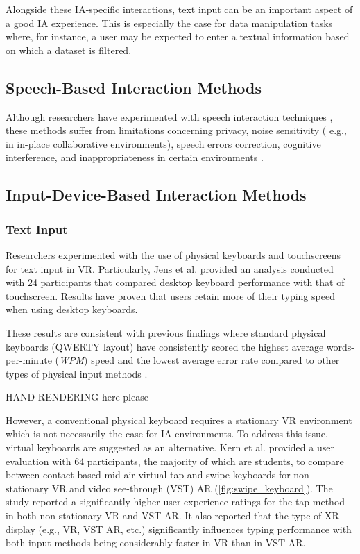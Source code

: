 \documentclass{vgtc}                          %
\begin{document}
\smallskip

\noindent Alongside these IA-specific interactions, text input can be an important aspect of a good IA
experience. This is especially the case for data manipulation tasks where, for instance, a user may be
expected to enter a textual information based on which a dataset is filtered.


\subsection {Speech-Based Interaction Methods}

\noindent Although researchers have experimented with speech interaction techniques
\cite{wizualization_toolkit}, these methods suffer from limitations concerning privacy, noise sensitivity (
e.g., in in-place collaborative environments), speech errors correction, cognitive interference, and
inappropriateness in certain environments \cite{limits_of_speech_recognition}.

\subsection {Input-Device-Based Interaction Methods}
\subsubsection {Text Input}
\noindent Researchers experimented with the use of physical keyboards and touchscreens for text input
in VR. Particularly, Jens et al. \cite{keyboard_vs_touchscreen} provided an analysis conducted with 24
participants that compared desktop keyboard performance with that of touchscreen. Results have proven that
users retain more of their typing speed when using desktop keyboards.

These results are consistent with previous findings where standard physical keyboards
(QWERTY layout) have consistently scored the highest average words-per-minute (\textit{WPM}) speed and the
lowest average error rate compared to other types of physical input methods \cite{physical_text_entry_comparison}.

HAND RENDERING here please

\noindent However, a conventional physical keyboard requires a stationary VR environment which is not necessarily the
case for IA environments. To address this issue, virtual keyboards are suggested as an alternative. Kern et
al. \cite{tap_vs_word_gesture_keyboards} provided a user evaluation with 64 participants, the majority of
which are students, to compare between contact-based mid-air virtual tap and swipe keyboards for
non-stationary VR and video see-through (VST) AR (\autoref{fig:swipe_keyboard}). The study reported a
significantly higher user experience ratings for the tap method in both non-stationary VR and VST AR. It also
reported that the type of XR display (e.g., VR, VST AR, etc.) significantly influences typing performance
with both input methods being considerably faster in VR than in VST AR.
\end{document}

